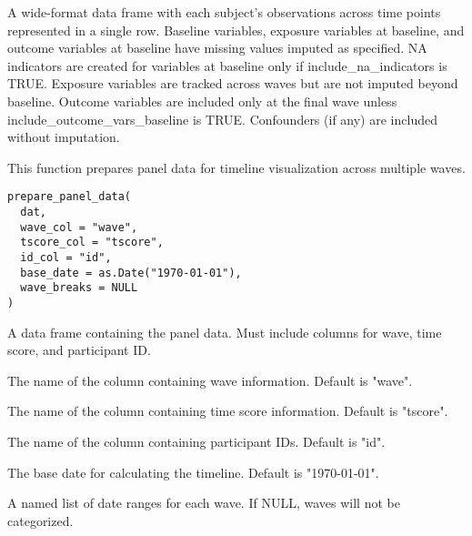 \documentclass[a4paper]{book}
\begin{document}
%
\begin{Value}
A wide-format data frame with each subject's observations across time points
represented in a single row. Baseline variables, exposure variables at baseline,
and outcome variables at baseline have missing values imputed as specified.
NA indicators are created for variables at baseline only if include\_na\_indicators is TRUE.
Exposure variables are tracked across waves but are not imputed beyond baseline.
Outcome variables are included only at the final wave unless include\_outcome\_vars\_baseline is TRUE.
Confounders (if any) are included without imputation.
\end{Value}
%
\begin{Description}
This function prepares panel data for timeline visualization across multiple waves.
\end{Description}
%
\begin{Usage}
\begin{verbatim}
prepare_panel_data(
  dat,
  wave_col = "wave",
  tscore_col = "tscore",
  id_col = "id",
  base_date = as.Date("1970-01-01"),
  wave_breaks = NULL
)
\end{verbatim}
\end{Usage}
%
\begin{Arguments}
\begin{ldescription}
\item[\code{dat}] A data frame containing the panel data. Must include columns for wave, time score, and participant ID.

\item[\code{wave\_col}] The name of the column containing wave information. Default is "wave".

\item[\code{tscore\_col}] The name of the column containing time score information. Default is "tscore".

\item[\code{id\_col}] The name of the column containing participant IDs. Default is "id".

\item[\code{base\_date}] The base date for calculating the timeline. Default is "1970-01-01".

\item[\code{wave\_breaks}] A named list of date ranges for each wave. If NULL, waves will not be categorized.
\end{ldescription}
\end{Arguments}
\end{document}
